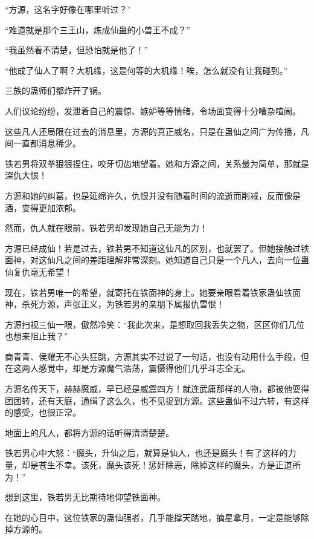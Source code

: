 
\begin{this_body}



“方源，这名字好像在哪里听过？”

“难道就是那个三王山，炼成仙蛊的小兽王不成？”

“我虽然看不清楚，但恐怕就是他了！”

“他成了仙人了啊？大机缘，这是何等的大机缘！唉，怎么就没有让我碰到。”

三族的蛊师们都炸开了锅。

人们议论纷纷，发泄着自己的震惊、嫉妒等等情绪，令场面变得十分嘈杂喧闹。

这些凡人还局限在过去的消息里，方源的真正威名，只是在蛊仙之间广为传播，凡间一直都消息稀少。

铁若男将双拳狠狠捏住，咬牙切齿地望着。她和方源之间，关系最为简单，那就是深仇大恨！

方源和她的纠葛，也是延绵许久，仇恨并没有随着时间的流逝而削减，反而像是酒，变得更加浓郁。

然而，仇人就在眼前，铁若男却发现她自己无能为力！

方源已经成仙！若是过去，铁若男不知道这仙凡的区别，也就罢了。但她接触过铁面神，对这仙凡之间的差距理解非常深刻。她知道自己只是一个凡人，去向一位蛊仙复仇毫无希望！

现在，铁若男唯一的希望，就寄托在铁面神的身上。她要亲眼看着铁家蛊仙铁面神，杀死方源，声张正义，为铁若男的亲朋下属报仇雪恨！

方源扫视三仙一眼，傲然冷笑：“我此次来，是想取回我丢失之物，区区你们几位也想来阻止我？”

商青青、侯耀无不心头狂跳，方源其实不过说了一句话，也没有动用什么手段，但在这两人感觉中，却是方源魔气浩荡，震慑得他们几乎斗志全无。

方源名传天下，赫赫魔威，早已经是威震四方！就连武庸那样的人物，都被他耍得团团转，还有天庭，通缉了这么久，也不见捉到方源。这些蛊仙不过六转，有这样的感受，也很正常。

地面上的凡人，都将方源的话听得清清楚楚。

铁若男心中大怒：“魔头，升仙之后，就算是仙人，也还是魔头！有了这样的力量，却是苍生不幸。该死，魔头该死！惩奸除恶，除掉这样的魔头，方是正道所为！”

想到这里，铁若男无比期待地仰望铁面神。

在她的心目中，这位铁家的蛊仙强者，几乎能撑天踏地，摘星拿月，一定是能够除掉方源的。


\end{this_body}
